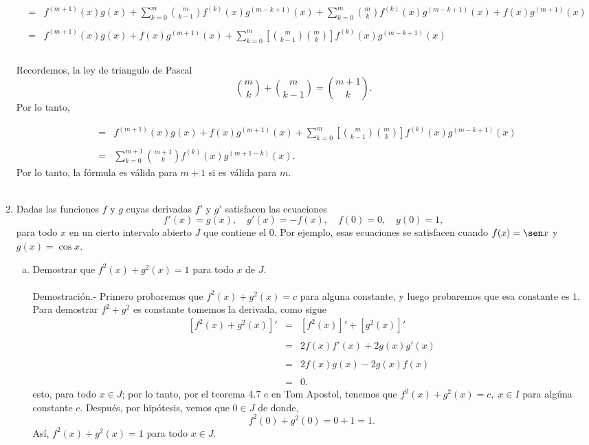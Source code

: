 \begin{enumerate}[\bfseries 1.]
	$$
	\begin{array}{rcl}
	    &=& f^{(m+1)}(x)g(x)+\displaystyle\sum_{k=0}^m {m\choose k-1} f^{(k)}(x)g^{(m-k+1)}(x)+\displaystyle\sum_{k=0}^m {m\choose k}f^{(k)}(x)g^{(m-k+1)}(x)+f(x)g^{(m+1)}(x)\\\\
	    &=& f^{(m+1)}(x)g(x)+f(x)g^{(m+1)}(x)+\displaystyle\sum_{k=0}^m \left[{m\choose k-1}{m\choose k}\right] f^{(k)}(x)g^{(m-k+1)}(x)\\\\
	\end{array}
	$$

	Recordemos, la ley de triangulo de Pascal
	$${m\choose k}+{m\choose k-1}={m+1\choose k}.$$
	Por lo tanto,

	$$
	\begin{array}{rcl}
	    &=& f^{(m+1)}(x)g(x)+f(x)g^{(m+1)}(x)+\displaystyle\sum_{k=0}^m \left[{m\choose k-1}{m\choose k}\right] f^{(k)}(x)g^{(m-k+1)}(x)\\\\
	    &=& \displaystyle\sum_{k=0}^{m+1} {m+1\choose k} f^{(k)}(x)g^{(m+1-k)}(x).
	\end{array}
	$$
	Por lo tanto, la fórmula es válida para $m+1$ si es válida para $m$.\\\\


    \item Dadas las funciones $f$ y $g$ cuyas derivadas $f'$ y $g'$ satisfacen las ecuaciones
    $$f'(x)=g(x),\quad g'(x)=-f(x),\quad f(0)=0,\quad g(0)=1,$$
    para todo $x$ en un cierto intervalo abierto $J$ que contiene el $0$. Por ejemplo, esas ecuaciones se satisfacen cuando $f(x)=\sen x$ y $g(x)=\cos x.$

    \begin{enumerate}[a)]
	
	\item Demostrar que $f^2(x)+g^2(x)=1$ para todo $x$ de $J$.\\\\
	    Demostración.-\; Primero probaremos que $f^2(x)+g^2(x)=c$ para alguna constante, y luego probaremos que esa constante es $1.$ Para demostrar $f^2+g^2$ es constante tomemos la derivada, como sigue
	    $$
	    \begin{array}{rcl}
		\left[f^2(x)+g^2(x)\right]' &=& \left[f^2(x)\right]' + \left[g^2(x)\right]'\\\\
			       &=& 2f(x)f'(x)+2g(x)g'(x)\\\\
			       &=& 2f(x)g(x)-2g(x)f(x)\\\\
			       &=& 0.
	    \end{array}
	    $$
	    esto, para todo $x\in J$; por lo tanto, por el teorema 4.7 c en Tom Apostol, tenemos que $f^2(x)+g^2(x)=c,\; x\in I$ para algúna constante $c$. Después, por hipótesis, vemos que $0\in J$ de donde,
	    $$f^2(0)+g^2(0)=0+1=1.$$
	    Así, $f^2(x)+g^2(x)=1$ para todo $x\in J$.\\\\
	

\end{enumerate}
\end{enumerate}
